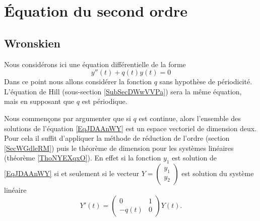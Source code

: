 \section{Équation du second ordre}

\subsection{Wronskien}

Nous considérons ici une équation différentielle de la forme
\begin{equation}    \label{EqJDAAnWY}
    y''(t)+q(t)y(t)=0
\end{equation}
Dans ce point nous allons considérer la fonction \( q\) sans hypothèse de périodicité. L'équation de Hill (sous-section \ref{SubSecDWwVVPa}) sera la même équation, mais en supposant que \( q\) est périodique.

Nous commençons par argumenter que si \( q\) est continue, alors l'ensemble des solutions de l'équation \eqref{EqJDAAnWY} est un espace vectoriel de dimension deux. Pour cela il suffit d'appliquer la méthode de réduction de l'ordre (section \ref{SecWGdleRM}) puis le théorème de dimension pour les systèmes linéaires (théorème \ref{ThoNYEXqxO}). En effet si la fonction \( y_1\) est solution de \eqref{EqJDAAnWY} si et seulement si le vecteur \(Y= \begin{pmatrix}
    y_1    \\ 
    y_2    
\end{pmatrix}\) est solution du système linéaire
\begin{equation}
    Y'(t)=\begin{pmatrix}
        0    &   1    \\ 
        -q(t)    &   0    
    \end{pmatrix}Y(t).
\end{equation}


